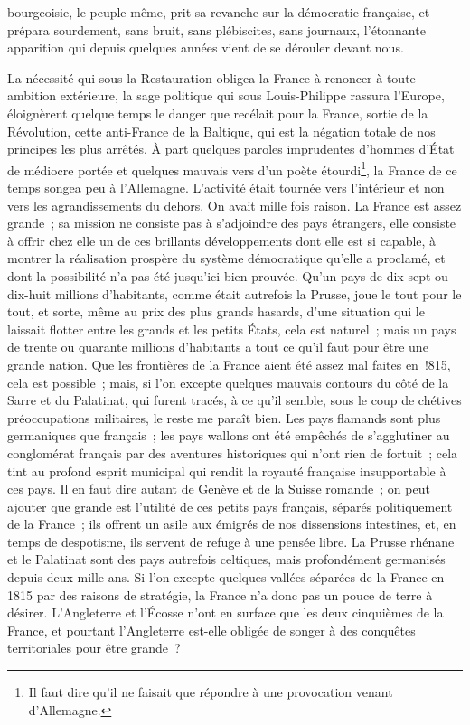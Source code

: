 \documentclass[french,twoside]{book} %
\begin{document}
bourgeoisie, le peuple même, prit sa revanche sur la démocratie française, et prépara sourdement, sans bruit, sans plébiscites, sans journaux, l’étonnante apparition qui depuis quelques années vient de se dérouler devant nous.\par
La nécessité qui sous la Restauration obligea la France à renoncer à toute ambition extérieure, la sage politique qui sous Louis-Philippe rassura l’Europe, éloignèrent quelque temps le danger que recélait pour la France, sortie de la Révolution, cette anti-France de la Baltique, qui est la négation totale de nos principes les plus arrêtés. À part quelques paroles imprudentes d’hommes d’État de médiocre portée et quelques mauvais vers d’un poète étourdi\footnote{Il faut dire qu’il ne faisait que répondre à une provocation venant d’Allemagne.}, la France de ce temps songea peu à l’Allemagne. L’activité était tournée vers l’intérieur et non vers les agrandissements du dehors. On avait mille fois raison. La France est assez grande ; sa mission ne consiste pas à s’adjoindre des pays étrangers, elle consiste à offrir chez elle un de ces brillants développements dont elle est si capable, à montrer la réalisation prospère du système démocratique qu’elle a proclamé, et dont la possibilité n’a pas été jusqu’ici bien prouvée. Qu’un pays de dix-sept ou dix-huit millions d’habitants, comme était autrefois la Prusse, joue le tout pour le tout, et sorte, même au prix des plus grands hasards, d’une situation qui le laissait flotter entre les grands et les petits États, cela est naturel ; mais un pays de trente ou quarante millions d’habitants a tout ce qu’il faut pour être une grande nation. Que les frontières de la France aient été assez mal faites en !815, cela est possible ; mais, si l’on excepte quelques mauvais contours du côté de la Sarre et du Palatinat, qui furent tracés, à ce qu’il semble, sous le coup de chétives préoccupations militaires, le reste me paraît bien. Les pays flamands sont plus germaniques que français ; les pays wallons ont été empêchés de s’agglutiner au conglomérat français par des aventures historiques qui n’ont rien de fortuit ; cela tint au profond esprit municipal qui rendit la royauté française insupportable à ces pays. Il en faut dire autant de Genève et de la Suisse romande ; on peut ajouter que grande est l’utilité de ces petits pays français, séparés politiquement de la France ; ils offrent un asile aux émigrés de nos dissensions intestines, et, en temps de despotisme, ils servent de refuge à une pensée libre. La Prusse rhénane et le Palatinat sont des pays autrefois celtiques, mais profondément germanisés depuis deux mille ans. Si l’on excepte quelques vallées séparées de la France en 1815 par des raisons de stratégie, la France n’a donc pas un pouce de terre à désirer. L’Angleterre et l’Écosse n’ont en surface que les deux cinquièmes de la France, et pourtant l’Angleterre est-elle obligée de songer à des conquêtes territoriales pour être grande ?\par
\end{document}
